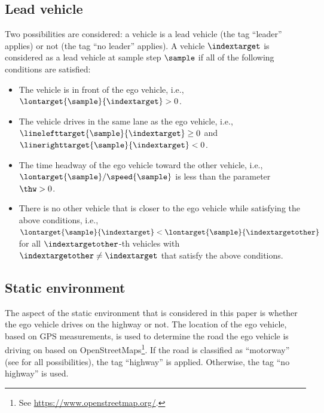 \subsection{Lead vehicle}
\label{sec:lead vehicle}

Two possibilities are considered: a vehicle is a lead vehicle (the tag ``leader'' applies) or not (the tag ``no leader'' applies). A vehicle $\indextarget$ is considered as a lead vehicle at sample step $\sample$ if all of the following conditions are satisfied:
\begin{itemize}
	\item The vehicle is in front of the ego vehicle, i.e., $\lontarget{\sample}{\indextarget}>0$.
	\item The vehicle drives in the same lane as the ego vehicle, i.e., $\linelefttarget{\sample}{\indextarget} \geq 0$ and $\linerighttarget{\sample}{\indextarget} < 0$.
	\item The time headway of the ego vehicle toward the other vehicle, i.e., $\lontarget{\sample}/\speed{\sample}$ is less than the parameter $\thw>0$.
	\item There is no other vehicle that is closer to the ego vehicle while satisfying the above conditions, i.e., $\lontarget{\sample}{\indextarget} < \lontarget{\sample}{\indextargetother}$ for all $\indextargetother$-th vehicles with $\indextargetother \ne \indextarget$ that satisfy the above conditions.
\end{itemize}
\cendc



\subsection{Static environment}
\label{sec:static environment}

\cstartc
The aspect of the static environment that is considered in this paper is whether the ego vehicle drives on the highway or not. The location of the ego vehicle, based on GPS measurements, is used to determine the road the ego vehicle is driving on based on OpenStreetMaps\footnote{\cstartc See \url{https://www.openstreetmap.org/}.\cendc}. If the road is classified as ``motorway'' (see \autocite{osm_highway} for all possibilities), the tag ``highway'' is applied. Otherwise, the tag ``no highway'' is used.
\cendc
